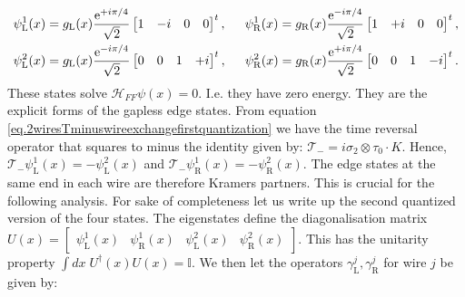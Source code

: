 \begin{align}
\psi^1_{\text{L}}(x) &= g_{\text{L}}(x)\frac{\text{e}^{+i\pi/4}}{\sqrt{2}}\begin{bmatrix} 1 & -i & 0 & 0 \end{bmatrix}^t , \hspace{0.5cm} \psi^1_{\text{R}}(x) = g_{\text{R}}(x)\frac{\text{e}^{-i\pi/4}}{\sqrt{2}}\begin{bmatrix} 1 & +i & 0 & 0 \end{bmatrix}^t, \nonumber \\
\psi^2_{\text{L}}(x) &= g_{\text{L}}(x)\frac{\text{e}^{-i\pi/4}}{\sqrt{2}}\begin{bmatrix} 0 & 0 & 1 & +i \end{bmatrix}^t , \hspace{0.5cm} \psi^2_{\text{R}}(x) = g_{\text{R}}(x)\frac{\text{e}^{+i\pi/4}}{\sqrt{2}}\begin{bmatrix} 0 & 0 & 1 & -i \end{bmatrix}^t.
\end{align}
These states solve $\mathcal{H}_{FF}\psi(x) = 0$. I.e. they have zero energy. They are the explicit forms of the gapless edge states. From equation \eqref{eq.2wiresTminuswireexchangefirstquantization} we have the time reversal operator that squares to minus the identity given by: $\mathcal{T}_- = i\sigma_2\otimes\tau_0 \cdot K$. Hence, $\mathcal{T}_-\psi^1_{\text{L}}(x) = -\psi^2_{\text{L}}(x)$ and $\mathcal{T}_-\psi^1_{\text{R}}(x) = -\psi^2_{\text{R}}(x)$. The edge states at the same end in each wire are therefore Kramers partners. This is crucial for the following analysis. For sake of completeness let us write up the second quantized version of the four states. The eigenstates define the diagonalisation matrix $U(x) = \begin{bmatrix} \psi^{1}_{\text{L}}(x) & \psi^{1}_{\text{R}}(x) & \psi^{2}_{\text{L}}(x) & \psi^{2}_{\text{R}}(x) \end{bmatrix}$. This has the unitarity property $\int dx \; U^\dagger(x) U(x) = \mathbb{I}$. We then let the operators $\gamma^{j}_{\text{L}}, \gamma^{j}_{\text{R}}$ for wire $j$ be given by:
